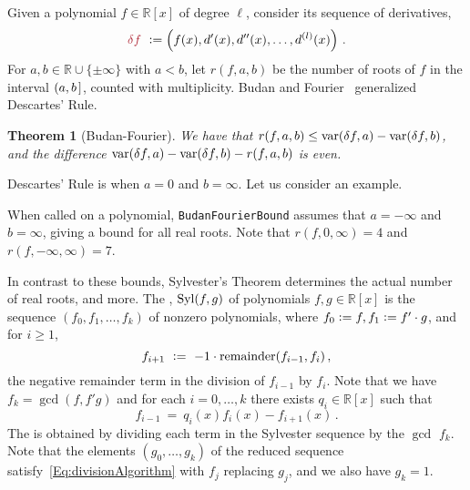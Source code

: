 \documentclass[12pt]{amsart}
\newtheorem{theorem}{Theorem}
\theoremstyle{definition}
\newcommand{\RR}{\mathbb{R}}
\DeclareMathOperator{\var}{{\rm var}}
\DeclareMathOperator{\Syl}{{\rm Syl}}
\newcommand{\defcolor}[1]{{\color{Maroon}#1}}
\newcommand{\demph}[1]{\defcolor{{\sl #1}}}
\begin{document}
Given a polynomial $f\in\RR[x]$ of degree $\ell$, consider its sequence of derivatives,
%
 \[
   \defcolor{\delta f}\ \vcentcolon= \left(f(x),d'(x),d''(x),\dots,d^{(l)}(x)\right)\,.
 \]
%
For $a,b\in \RR\cup\{\pm \infty\}$ with $a<b$, let \defcolor{$r(f,a,b)$} be the number of roots of $f$ in the interval $(a,b\hspace{.05cm}]$, counted
with multiplicity.
Budan and Fourier~\cite[Ch.\ 2]{So_Book} generalized Descartes' Rule.

\begin{theorem}[Budan-Fourier]
  We have that $r(f,a,b)\leq \var(\delta f,a) -\var(\delta f,b)$, and the difference
  $\var(\delta f,a) -\var(\delta f,b)-r(f,a,b)$ is even. 
\end{theorem}

Descartes' Rule is when $a=0$ and $b=\infty$.
Let us consider an example.
%
\begin{leftbar}

\end{leftbar}
%
When called on a polynomial, \texttt{BudanFourierBound} assumes that $a=-\infty$ and $b=\infty$, giving a bound for all real roots.
Note that $r(f,0,\infty)=4$ and $r(f,-\infty,\infty)=7$.

In contrast to these bounds, 
Sylvester's Theorem determines the actual number of real roots, and more.
The \demph{Sylvester sequence}, \defcolor{$\Syl(f,g)$} of polynomials $f,g\in\RR[x]$ is the sequence
$\left(f_0,f_1,\dotsc,f_k\right)$ of nonzero polynomials, where $f_0\vcentcolon= f, f_1 \vcentcolon= f'\cdot g$,
and for $i\geq 1$, 
%
  \[
    f_{i+1}\ \vcentcolon=\ -1\cdot \mbox{remainder}(f_{i-1},f_i)\,,
  \]
%
the negative remainder term in the division of $f_{i-1}$ by $f_i$.
Note that we have $f_k = \gcd(f,f'g)$ and for each $i=0,\dotsc,k$ there exists $q_i\in\RR[x]$ such that
%
 \begin{equation}\label{Eq:divisionAlgorithm}
    f_{i-1}\ =\ q_i(x)f_i(x)-f_{i+1}(x)\,.
 \end{equation}
%
The \demph{reduced Sylvester sequence} is obtained by dividing each term in the Sylvester sequence by the $\gcd$ $f_k$.
Note that the elements $(g_0,\dotsc,g_k)$ of the reduced sequence satisfy~\eqref{Eq:divisionAlgorithm} with $f_j$ replacing $g_j$, and
we also have $g_k=1$.
\end{document}
